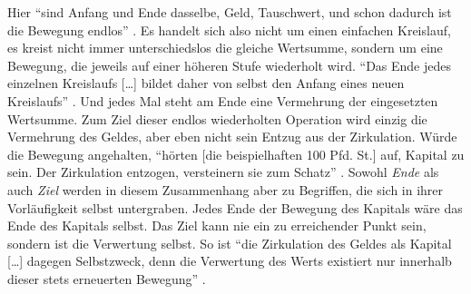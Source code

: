 \documentclass[12pt,
               paper=a4,
               twoside=false,
               onehalfspacing,
               bibliography=totoc,
               toc=graduated,
               ]{scrartcl}
\newcommand{\lips}{\dots\unkern}
\newcommand{\pc}[2]{\parencite[#1]{#2}}
\newcommand{\vgl}[2]{\parencite[vgl.][#1]{#2}}
\newcommand{\worries}[1]{\ifdraft{\textcolor{blue}{\texttt{(#1)}}}{}}
\begin{document}


Hier "`sind Anfang und Ende dasselbe, Geld, Tauschwert, und schon
dadurch ist die Bewegung endlos"' \pc{166}{kap}. Es handelt sich also
nicht um einen einfachen Kreislauf, es kreist nicht immer
unterschiedslos die gleiche Wertsumme, sondern um eine Bewegung, die
jeweils auf einer höheren Stufe wiederholt wird. "`Das Ende jedes
einzelnen Kreislaufs [\lips] bildet daher von selbst den Anfang eines
neuen Kreislaufs"' \pc{S. 166 f.}{kap}. Und jedes Mal steht am Ende
eine Vermehrung der eingesetzten Wertsumme. Zum Ziel dieser endlos
wiederholten Operation wird einzig die Vermehrung des Geldes, aber
eben nicht sein Entzug aus der Zirkulation. Würde die Bewegung
angehalten, "`hörten [die beispielhaften 100 Pfd. St.] auf, Kapital zu
sein. Der Zirkulation entzogen, versteinern sie zum Schatz"'
\pc{166}{kap}. Sowohl \emph{Ende} als auch \emph{Ziel} werden in
diesem Zusammenhang aber zu Begriffen, die sich in ihrer Vorläufigkeit
selbst untergraben. Jedes Ende der Bewegung des Kapitals wäre das Ende
des Kapitals selbst. Das Ziel kann nie ein zu erreichender Punkt sein,
sondern ist die Verwertung selbst. So ist "`die Zirkulation des Geldes
als Kapital [\lips] dagegen Selbstzweck, denn die Verwertung des Werts
existiert nur innerhalb dieser stets erneuerten Bewegung"'
\pc{167}{kap}.


\end{document}
